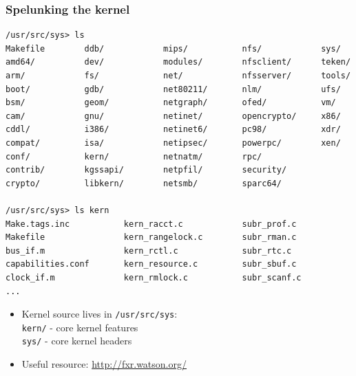 \begin{frame}[fragile]
  \frametitle{Spelunking the kernel}

  \begin{tiny}
\begin{verbatim}
/usr/src/sys> ls
Makefile        ddb/            mips/           nfs/            sys/
amd64/          dev/            modules/        nfsclient/      teken/
arm/            fs/             net/            nfsserver/      tools/
boot/           gdb/            net80211/       nlm/            ufs/
bsm/            geom/           netgraph/       ofed/           vm/
cam/            gnu/            netinet/        opencrypto/     x86/
cddl/           i386/           netinet6/       pc98/           xdr/
compat/         isa/            netipsec/       powerpc/        xen/
conf/           kern/           netnatm/        rpc/
contrib/        kgssapi/        netpfil/        security/
crypto/         libkern/        netsmb/         sparc64/

/usr/src/sys> ls kern
Make.tags.inc           kern_racct.c            subr_prof.c
Makefile                kern_rangelock.c        subr_rman.c
bus_if.m                kern_rctl.c             subr_rtc.c
capabilities.conf       kern_resource.c         subr_sbuf.c
clock_if.m              kern_rmlock.c           subr_scanf.c
...
\end{verbatim}
  \end{tiny}

  \begin{itemize}
    \item Kernel source lives in \texttt{/usr/src/sys}: \\
      \texttt{kern/} - core kernel features \\
      \texttt{sys/} - core kernel headers

    \item Useful resource: \url{http://fxr.watson.org/}
  \end{itemize}
\end{frame}

